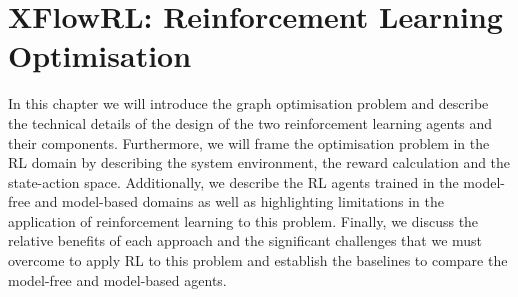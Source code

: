 \chapter{XFlowRL: Reinforcement Learning Optimisation}
\label{chap:rlopt}

In this chapter we will introduce the graph optimisation problem and describe the technical details of the design of the two reinforcement learning agents and their components. Furthermore, we will frame the optimisation problem in the RL domain by describing the system environment, the reward calculation and the state-action space. Additionally, we describe the RL agents trained in the model-free and model-based domains as well as highlighting limitations in the application of reinforcement learning to this problem. Finally, we discuss the relative benefits of each approach and the significant challenges that we must overcome to apply RL to this problem and establish the baselines to compare the model-free and model-based agents.






